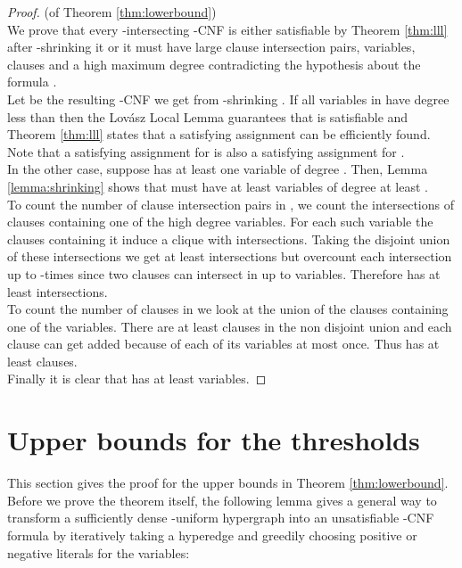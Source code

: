 \documentclass[11pt,letterpaper]{article}
\begin{document}
\begin{proof} (of Theorem \ref{thm:lowerbound})\\
We prove that every -intersecting -CNF  is either satisfiable by Theorem \ref{thm:lll} after -shrinking it or it must have large clause intersection pairs, variables, clauses and a high maximum degree contradicting the hypothesis about the formula .\\

Let  be the resulting -CNF we get from -shrinking . If all variables in  have degree less than  then the Lov\'asz Local Lemma guarantees that  is satisfiable and Theorem \ref{thm:lll} states that a satisfying assignment can be efficiently found. Note that a satisfying assignment for  is also a satisfying assignment for .\\

In the other case, suppose  has at least one variable of degree . Then, Lemma \ref{lemma:shrinking} shows that  must have at least  variables of degree at least .\\

To count the number of clause intersection pairs in , we count the intersections of clauses containing one of the  high degree variables. For each such variable the clauses containing it induce a clique with  intersections. Taking the disjoint union of these intersections we get at least  intersections but overcount each intersection up to -times since two clauses can intersect in up to  variables. Therefore  has at least  intersections.\\

To count the number of clauses in  we look at the union of the clauses containing one of the  variables. There are at least  clauses in the non disjoint union and each clause can get added because of each of its  variables at most once. Thus  has at least  clauses.\\

Finally it is clear that  has at least  variables. 
\end{proof}



\section{Upper bounds for the thresholds}

This section gives the proof for the upper bounds in Theorem \ref{thm:lowerbound}.\\

Before we prove the theorem itself, the following lemma gives a general way to transform a sufficiently dense -uniform hypergraph into an unsatisfiable -CNF formula by iteratively taking a hyperedge and greedily choosing positive or negative literals for the variables:\\
\end{document}
